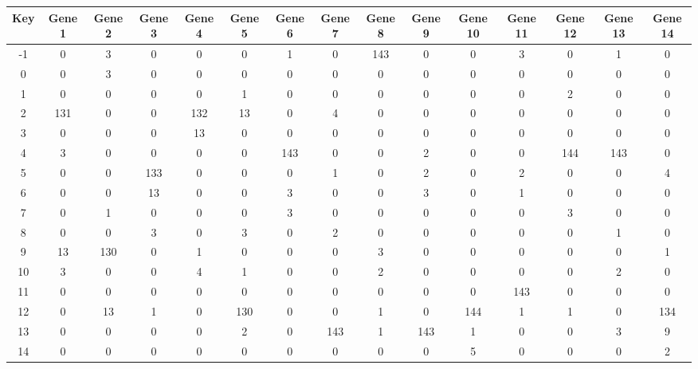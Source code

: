 \begin{tabular}{|c|c|c|c|c|c|c|c|c|c|c|c|c|c|c|}
\hline
Key & Gene 1 & Gene 2 & Gene 3 & Gene 4 & Gene 5 & Gene 6 & Gene 7 & Gene 8 & Gene 9 & Gene 10 & Gene 11 & Gene 12 & Gene 13 & Gene 14 \\
\hline
-1 & 0 & 3 & 0 & 0 & 0 & 1 & 0 & 143 & 0 & 0 & 3 & 0 & 1 & 0 \\
0 & 0 & 3 & 0 & 0 & 0 & 0 & 0 & 0 & 0 & 0 & 0 & 0 & 0 & 0 \\
1 & 0 & 0 & 0 & 0 & 1 & 0 & 0 & 0 & 0 & 0 & 0 & 2 & 0 & 0 \\
2 & 131 & 0 & 0 & 132 & 13 & 0 & 4 & 0 & 0 & 0 & 0 & 0 & 0 & 0 \\
3 & 0 & 0 & 0 & 13 & 0 & 0 & 0 & 0 & 0 & 0 & 0 & 0 & 0 & 0 \\
4 & 3 & 0 & 0 & 0 & 0 & 143 & 0 & 0 & 2 & 0 & 0 & 144 & 143 & 0 \\
5 & 0 & 0 & 133 & 0 & 0 & 0 & 1 & 0 & 2 & 0 & 2 & 0 & 0 & 4 \\
6 & 0 & 0 & 13 & 0 & 0 & 3 & 0 & 0 & 3 & 0 & 1 & 0 & 0 & 0 \\
7 & 0 & 1 & 0 & 0 & 0 & 3 & 0 & 0 & 0 & 0 & 0 & 3 & 0 & 0 \\
8 & 0 & 0 & 3 & 0 & 3 & 0 & 2 & 0 & 0 & 0 & 0 & 0 & 1 & 0 \\
9 & 13 & 130 & 0 & 1 & 0 & 0 & 0 & 3 & 0 & 0 & 0 & 0 & 0 & 1 \\
10 & 3 & 0 & 0 & 4 & 1 & 0 & 0 & 2 & 0 & 0 & 0 & 0 & 2 & 0 \\
11 & 0 & 0 & 0 & 0 & 0 & 0 & 0 & 0 & 0 & 0 & 143 & 0 & 0 & 0 \\
12 & 0 & 13 & 1 & 0 & 130 & 0 & 0 & 1 & 0 & 144 & 1 & 1 & 0 & 134 \\
13 & 0 & 0 & 0 & 0 & 2 & 0 & 143 & 1 & 143 & 1 & 0 & 0 & 3 & 9 \\
14 & 0 & 0 & 0 & 0 & 0 & 0 & 0 & 0 & 0 & 5 & 0 & 0 & 0 & 2 \\
\hline
\end{tabular}